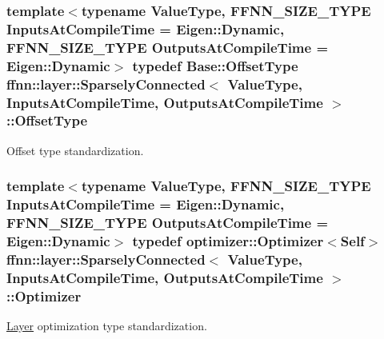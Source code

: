 \hypertarget{classffnn_1_1layer_1_1_sparsely_connected_aca8272f02c6417eea3c77dc0cb2bb49e}{
\subsubsection[{Offset\-Type}]{\setlength{\rightskip}{0pt plus 5cm}template$<$typename Value\-Type, F\-F\-N\-N\-\_\-\-S\-I\-Z\-E\-\_\-\-T\-Y\-P\-E Inputs\-At\-Compile\-Time = Eigen\-::\-Dynamic, F\-F\-N\-N\-\_\-\-S\-I\-Z\-E\-\_\-\-T\-Y\-P\-E Outputs\-At\-Compile\-Time = Eigen\-::\-Dynamic$>$ typedef {\bf Base\-::\-Offset\-Type} {\bf ffnn\-::layer\-::\-Sparsely\-Connected}$<$ Value\-Type, Inputs\-At\-Compile\-Time, Outputs\-At\-Compile\-Time $>$\-::{\bf Offset\-Type}}}\label{classffnn_1_1layer_1_1_sparsely_connected_aca8272f02c6417eea3c77dc0cb2bb49e}


Offset type standardization. 

\hypertarget{classffnn_1_1layer_1_1_sparsely_connected_a87466efb64ebf340fa07194c94846ace}{
\subsubsection[{Optimizer}]{\setlength{\rightskip}{0pt plus 5cm}template$<$typename Value\-Type, F\-F\-N\-N\-\_\-\-S\-I\-Z\-E\-\_\-\-T\-Y\-P\-E Inputs\-At\-Compile\-Time = Eigen\-::\-Dynamic, F\-F\-N\-N\-\_\-\-S\-I\-Z\-E\-\_\-\-T\-Y\-P\-E Outputs\-At\-Compile\-Time = Eigen\-::\-Dynamic$>$ typedef {\bf optimizer\-::\-Optimizer}$<${\bf Self}$>$ {\bf ffnn\-::layer\-::\-Sparsely\-Connected}$<$ Value\-Type, Inputs\-At\-Compile\-Time, Outputs\-At\-Compile\-Time $>$\-::{\bf Optimizer}}}\label{classffnn_1_1layer_1_1_sparsely_connected_a87466efb64ebf340fa07194c94846ace}


\hyperlink{classffnn_1_1layer_1_1_layer}{Layer} optimization type standardization. 

